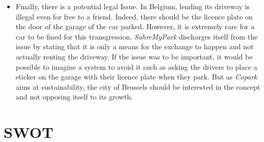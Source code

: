 \documentclass[12pt,a4paper,oneside]{book}
\newcommand{\bp}{\textit{Copark}}
\begin{document}
\begin{itemize}
\item Finally, there is a potential legal Issue. In Belgium, lending its driveway is illegal even for free to a friend. Indeed, there should be the licence plate on the door of the garage of the car parked. However, it is extremely rare for a car to be fined for this transgression. \textit{SahreMyPark} discharges itself from the issue by stating that it is only a means for the exchange to happen and not actually renting the driveway.\cite{smprtbf} If the issue was to be important, it would be possible to imagine a system to avoid it such as asking the drivers to place a sticker on the garage with their licence plate when they park. But as \bp{} aims at sustainability, the city of Brussels should be interested in the concept and not opposing itself to its growth.

\end{itemize}


\section{SWOT}
\end{document}
